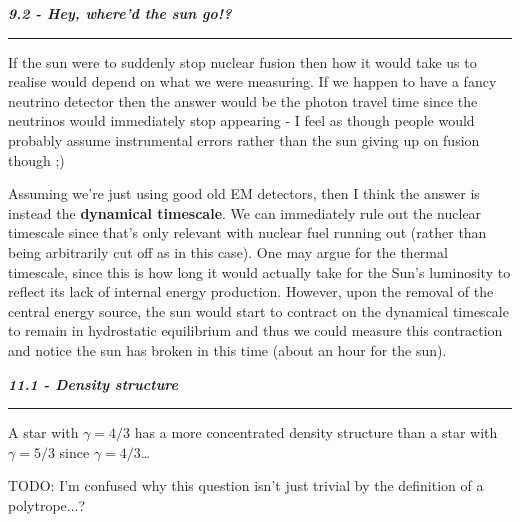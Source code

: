 \documentclass[12pt, letterpaper, twoside]{article}
\newcommand{\question}[1]{{\noindent \it #1}}
\newcommand{\answer}[1]{
    \par\noindent\rule{\textwidth}{0.4pt}#1\vspace{0.5cm}
}
\newcommand{\todo}[1]{{\color{red}\begin{center}TODO: #1\end{center}}}
\begin{document}
\question{\textbf{9.2 - Hey, where'd the sun go!?}}
\answer{
    If the sun were to suddenly stop nuclear fusion then how it would take us to realise would depend on what we were measuring. If we happen to have a fancy neutrino detector then the answer would be the photon travel time since the neutrinos would immediately stop appearing - I feel as though people would probably assume instrumental errors rather than the sun giving up on fusion though ;)

    Assuming we're just using good old EM detectors, then I think the answer is instead the \textbf{dynamical timescale}. We can immediately rule out the nuclear timescale since that's only relevant with nuclear fuel running out (rather than being arbitrarily cut off as in this case). One may argue for the thermal timescale, since this is how long it would actually take for the Sun's luminosity to reflect its lack of internal energy production. However, upon the removal of the central energy source, the sun would start to contract on the dynamical timescale to remain in hydrostatic equilibrium and thus we could measure this contraction and notice the sun has broken in this time (about an hour for the sun).
}

\question{\textbf{11.1 - Density structure}}
\answer{
    A star with $\gamma =4/3$ has a more concentrated density structure than a star with $\gamma =5/3$ since $\gamma = 4/3$\dots
    \todo{I'm confused why this question isn't just trivial by the definition of a polytrope...?}

}
\end{document}
